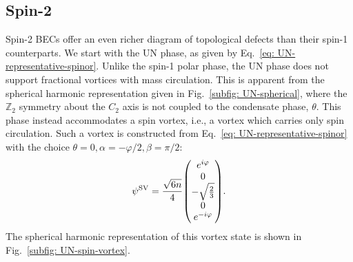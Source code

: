\subsection{Spin-2}\label{sec: vortices-spin-2}
Spin-2 BECs offer an even richer diagram of topological defects than their
spin-1 counterparts.
We start with the UN phase, as given by
Eq.~\eqref{eq: UN-representative-spinor}.
Unlike the spin-1 polar phase, the UN phase does not support fractional vortices
with mass circulation.
This is apparent from the spherical harmonic representation given in
Fig.~\ref{subfig: UN-spherical}, where the \(\mathbb{Z}_2\) symmetry about the
\(C_2\) axis is not coupled to the condensate phase, \(\theta \).
This phase instead accommodates a spin vortex, i.e., a vortex which carries only
spin circulation.
Such a vortex is constructed from Eq.~\eqref{eq: UN-representative-spinor} with
the choice \(\theta=0, \alpha=-\varphi/2, \beta=\pi/2\):
\begin{equation}
    \psi^\mathrm{SV} = \frac{\sqrt{6n}}{4}\mqty(
    e^{i\varphi} \\
    0 \\
    -\sqrt{\frac{2}{3}} \\
    0 \\ e^{-i\varphi}
    ).
\end{equation}
The spherical harmonic representation of this vortex state is shown in
Fig.~\ref{subfig: UN-spin-vortex}.
